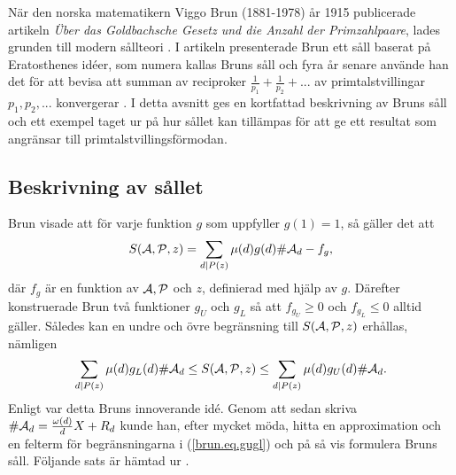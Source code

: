 
När den norska matematikern Viggo Brun (1881-1978) år 1915 publicerade artikeln \textit{Über das Goldbachsche Gesetz und die Anzahl der Primzahlpaare}, lades grunden till modern sållteori \cite{ViggoBrun}. 
I artikeln presenterade Brun ett såll baserat på Eratosthenes idéer, som numera kallas Bruns såll och fyra år senare använde han det för att bevisa att summan av reciproker $\frac{1}{p_1}+\frac{1}{p_2}+...$ av primtalstvillingar $p_1,p_2,...$ konvergerar \cite{ViggoBrun}.
I detta avsnitt ges en kortfattad beskrivning av Bruns såll och ett exempel taget ur \cite{cojocarumurty} på hur sållet kan tillämpas för att ge ett resultat som angränsar till primtalstvillingsförmodan.


\subsection{Beskrivning av sållet}
Brun visade att för varje funktion $g$ som uppfyller $g(1)=1$,
så gäller det att
\begin{equation*}
    \S{A}{P}{z} 
    = \sum_{d \mid P(z)} \mu(d) g(d) \card\A_d 
    - f_g,
\end{equation*} %
där $f_g$ är en funktion av $\A,\P$ och $z$, definierad med hjälp av $g$. 
Därefter konstruerade Brun två funktioner $g_U$ och $g_L$ så att $f_{g_U}\geq 0$ och $f_{g_L}\leq 0$ alltid gäller. 
Således kan en undre och övre begränsning till $\S{A}{P}{z}$ erhållas, nämligen
\begin{equation}\label{brun.eq.gugl}
    \sum_{d \mid P(z)} \mu(d) g_L(d) \card\A_d 
    \leq \S{A}{P}{z} 
    \leq \sum_{d \mid P(z)} \mu(d) g_U(d) \card\A_d.
\end{equation}
Enligt \cite{cojocarumurty} var detta Bruns innoverande idé.
Genom att sedan skriva $\card\A_d=\frac{\omega(d)}{d}X + R_d$ kunde han, efter mycket möda, hitta en approximation och en felterm för begränsningarna i (\ref{brun.eq.gugl}) och på så vis formulera Bruns såll. Följande sats är hämtad ur \cite[Kap. 6.2]{cojocarumurty}.


